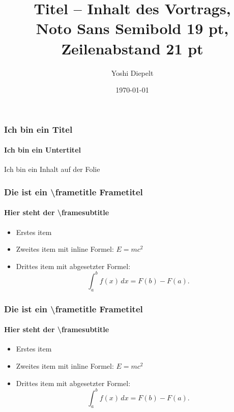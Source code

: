 \documentclass{beamer}
\title[Kurztitel der Präsentation]{Titel -- Inhalt des Vortrags, \\
Noto Sans Semibold 19 pt, \\
Zeilenabstand 21 pt}
\author[Vortragende]{Yoshi Diepelt}
\institute{Institut für Typografie}
\date{\today}
\begin{document}

\maketitle


\maketitle


\begin{frame}
  \frametitle{Ich bin ein Titel}
    \framesubtitle{Ich bin ein Untertitel}

    Ich bin ein Inhalt auf der Folie
\end{frame}


\begin{frame}
  \frametitle{Die ist ein \textbackslash frametitle Frametitel}
  \framesubtitle{Hier steht der \textbackslash framesubtitle}
  \lipsum[1][1-4]
  \begin{itemize}
    \item Erstes item
    \item Zweites item mit inline Formel: $E = mc^2$
    \item Drittes item mit abgesetzter Formel:
      \[
        \int_a^b f(x)\,dx = F(b) - F(a).
      \]
  \end{itemize}
\end{frame}


\begin{frame}[plain]
  \frametitle{Die ist ein \textbackslash frametitle Frametitel}
  \framesubtitle{Hier steht der \textbackslash framesubtitle}
  \lipsum[1][1-4]
  \begin{itemize}
    \item Erstes item
    \item Zweites item mit inline Formel: $E = mc^2$
    \item Drittes item mit abgesetzter Formel:
      \[
        \int_a^b f(x)\,dx = F(b) - F(a).
      \]
  \end{itemize}
\end{frame}
\end{document}
